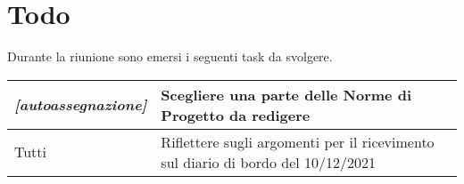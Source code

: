 \section{Todo}
Durante la riunione sono emersi i seguenti task da svolgere.

\begin{center}
  \begin{tabular}{|p{5cm}|p{7cm}|}
    \hline
    \textit{[autoassegnazione]} & Scegliere una parte delle Norme di Progetto da redigere  \\ \hline
    Tutti & Riflettere sugli argomenti per il ricevimento sul diario di bordo del 10/12/2021 \\ \hline
  \end{tabular}
\end{center}
